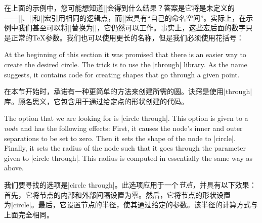 \begin{paracol}{2}
在上面的示例中，您可能想知道||会得到什么结果？答案是它将是未定义的——|\p|、|\x|和|\y|宏引用相同的逻辑点，而|\n|宏具有“自己的命名空间”。实际上，在示例中我们甚至可以将||替换为||，它仍然可以工作。事实上，这些宏后面的数字只是正常的\TeX 参数。我们也可以使用更长的名称，但是我们必须使用花括号：
%
\begin{codeexample}[preamble={\usetikzlibrary{calc}}]
\end{codeexample}

At the beginning of this section it was promised that there is an easier way to
create the desired circle. The trick is to use the |through| library. As the
name suggests, it contains code for creating shapes that go through a given
point.

在本节开始时，承诺有一种更简单的方法来创建所需的圆。诀窍是使用|through|库。顾名思义，它包含用于通过给定点的形状创建的代码。

The option that we are looking for is |circle through|. This option is given to
a \emph{node} and has the following effects: First, it causes the node's inner
and outer separations to be set to zero. Then it sets the shape of the node to
|circle|. Finally, it sets the radius of the node such that it goes through the
parameter given to |circle through|. This radius is computed in essentially the
same way as above.

我们要寻找的选项是|circle through|。此选项应用于一个\emph{节点}，并具有以下效果：首先，它将节点的内部和外部间隔设置为零。然后，它将节点的形状设置为|circle|。最后，它设置节点的半径，使其通过给定的参数。该半径的计算方式与上面完全相同。
%
\begin{codeexample}[preamble={\usetikzlibrary{through}}]
\end{codeexample}




\end{paracol}
